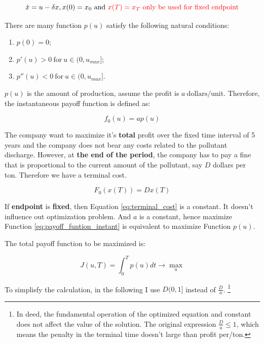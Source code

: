 \documentclass{article}
\begin{document}
\begin{equation}\label{cd:initial_condition}
    \dot{x}=u-\delta x, x(0)=x_0\ \text{and}\ {\color{red} x(T)=x_T\ \text{only be used for fixed endpoint}}
\end{equation}

There are many function $p(u)$ satisfy the following natural conditions:

\begin{enumerate}
    \item $p(0)=0$;
    \item $p'(u)>0\ \text{for}\ u\in(0,u_{max}]$;
    \item $p''(u)<0\ \text{for}\ u\in(0,u_{max}]$.
\end{enumerate}

$p(u)$ is the amount of production, assume the profit is $a\ \text{dollars/unit}$. Therefore, the instantaneous payoff function is defined as:

\begin{equation}\label{eq:payoff_funtion_instant}
    f_0(u)=ap(u)
\end{equation}

The company want to maximize it's \textbf{total} profit over the fixed time interval of 5 years and the company does not bear any costs related to the pollutant discharge. However, at \textbf{the end of the period}, the company has to pay a fine that is proportional to the current amount of the pollutant, say $D$ dollars per ton. Therefore we have a terminal cost.

\begin{equation}\label{eq:terminal_cost}
    F_0(x(T))=Dx(T)
\end{equation}

If \textbf{endpoint} is \textbf{fixed}, then Equation \eqref{eq:terminal_cost} is a constant. It doesn't influence out optimization problem. And $a$ is a constant, hence maximize Function \eqref{eq:payoff_funtion_instant} is equivalent to maximize Function $p(u)$.



The total payoff function to be maximized  is:

\begin{equation}\label{eq:optfunction_without_terminal_cost}
    J(u,T)=\int_{0}^{T}p(u)dt\rightarrow \max_{u}
\end{equation}

To simplisfy the calculation, in the following I use $D(0,1]$ instead of $\frac{D}{a}$. \footnote{In deed, the fundamental operation of the optimized equation and constant does not affect the value of the solution. The original expression $\frac{D}{a}\leq 1$, which means the penalty in the terminal time doesn't large than profit per/ton.} 
\end{document}
